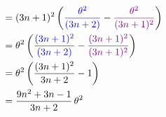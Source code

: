 \documentclass[12pt]{article}
\newcommand{\pars}[1]{\left( {#1} \right) }
\begin{document}
\begin{enumerate}
\begin{enumerate}
\begin{mybox}
\begin{align}
                    &= (3n+1)^2  \pars{\color{blue} \frac{\theta^{2}}{(3n+2)} \color{black}-\color{violet} \frac{\theta^2}{(3n+1)^2} \color{black}}\notag\\
                    &= \theta^2   \pars{\color{blue} \frac{(3n+1)^2}{(3n+2)} \color{black}-\color{violet} \frac{(3n+1)^2}{(3n+1)^2} \color{black}}\notag\\
                    &= \theta^2\pars{\frac{(3n+1)^2}{3n+2}-1} \notag\\
                    &= \frac{9n^2+3n-1}{3n+2} \, \theta^2 \notag
                \end{align}
                
                \begin{center}\color{magenta} \color{black}\end{center}
        \end{mybox}
    \end{enumerate}
    
    
    

\end{enumerate}
\end{document}
